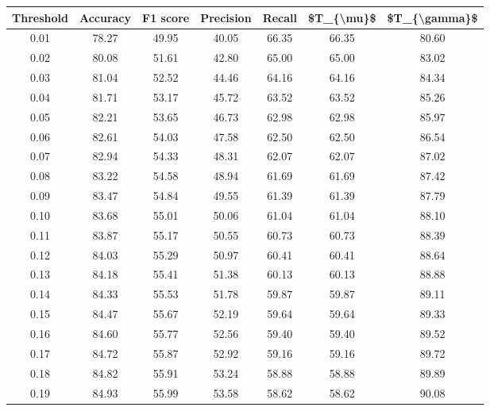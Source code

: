 \begin{tabular}{|c|c|c|c|c|c|c|}
\hline
 Threshold &  Accuracy &  F1 score &  Precision &  Recall &  \$T\_\{\textbackslash mu\}\$ &  \$T\_\{\textbackslash gamma\}\$ \\
\hline
      0.01 &     78.27 &     49.95 &      40.05 &   66.35 &      66.35 &         80.60 \\
      0.02 &     80.08 &     51.61 &      42.80 &   65.00 &      65.00 &         83.02 \\
      0.03 &     81.04 &     52.52 &      44.46 &   64.16 &      64.16 &         84.34 \\
      0.04 &     81.71 &     53.17 &      45.72 &   63.52 &      63.52 &         85.26 \\
      0.05 &     82.21 &     53.65 &      46.73 &   62.98 &      62.98 &         85.97 \\
      0.06 &     82.61 &     54.03 &      47.58 &   62.50 &      62.50 &         86.54 \\
      0.07 &     82.94 &     54.33 &      48.31 &   62.07 &      62.07 &         87.02 \\
      0.08 &     83.22 &     54.58 &      48.94 &   61.69 &      61.69 &         87.42 \\
      0.09 &     83.47 &     54.84 &      49.55 &   61.39 &      61.39 &         87.79 \\
      0.10 &     83.68 &     55.01 &      50.06 &   61.04 &      61.04 &         88.10 \\
      0.11 &     83.87 &     55.17 &      50.55 &   60.73 &      60.73 &         88.39 \\
      0.12 &     84.03 &     55.29 &      50.97 &   60.41 &      60.41 &         88.64 \\
      0.13 &     84.18 &     55.41 &      51.38 &   60.13 &      60.13 &         88.88 \\
      0.14 &     84.33 &     55.53 &      51.78 &   59.87 &      59.87 &         89.11 \\
      0.15 &     84.47 &     55.67 &      52.19 &   59.64 &      59.64 &         89.33 \\
      0.16 &     84.60 &     55.77 &      52.56 &   59.40 &      59.40 &         89.52 \\
      0.17 &     84.72 &     55.87 &      52.92 &   59.16 &      59.16 &         89.72 \\
      0.18 &     84.82 &     55.91 &      53.24 &   58.88 &      58.88 &         89.89 \\
      0.19 &     84.93 &     55.99 &      53.58 &   58.62 &      58.62 &         90.08 \\

\end{tabular}
